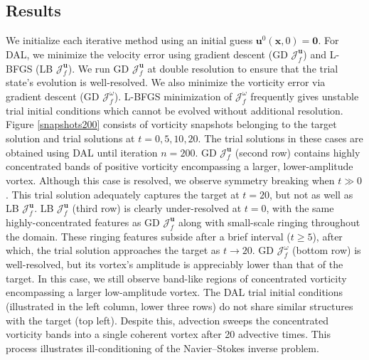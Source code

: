 \documentclass[%
 reprint,
 amsmath,amssymb,
 aps,
 pre,
]{revtex4-2}
\renewcommand{\vec}[1]{\boldsymbol{#1}}
\newcommand{\JUf}{\mathcal{J}^{\vec{u}}_f}
\newcommand{\Jwf}{\mathcal{J}^{\omega}_f}
\begin{document}
\subsection{Results}
We initialize each iterative method using an initial guess $\vec{u}^0(\vec{x},0)=\vec{0}$.
For DAL, we minimize the velocity error using gradient descent (GD $\JUf$) and L-BFGS (LB $\JUf$).
We run GD $\JUf$ at double resolution to ensure that the trial state's evolution is well-resolved.
We also minimize the vorticity error via gradient descent (GD $\Jwf$).
L-BFGS minimization of $\Jwf$ frequently gives unstable trial initial conditions which cannot be evolved without additional resolution.
Figure \ref{snapshots200} consists of vorticity snapshots belonging to the target solution and trial solutions at $t=0,5,10,20$.
The trial solutions in these cases are obtained using DAL until iteration $n=200$.
GD $\JUf$ (second row) contains highly concentrated bands of positive vorticity encompassing a larger, lower-amplitude vortex.
Although this case is resolved, we observe symmetry breaking when $t\gg 0$.
This trial solution adequately captures the target at $t=20$, but not as well as LB $\JUf$.
LB $\JUf$ (third row) is clearly under-resolved at $t=0$, with the same highly-concentrated features as GD $\JUf$ along with small-scale ringing throughout the domain.
These ringing features subside after a brief interval ($t\geq 5$), after which, the trial solution approaches the target as $t\to 20$.
GD $\Jwf$ (bottom row) is well-resolved, but its vortex's amplitude is appreciably lower than that of the target.
In this case, we still observe band-like regions of concentrated vorticity encompassing a larger low-amplitude vortex.
The DAL trial initial conditions (illustrated in the left column, lower three rows) do not share similar structures with the target (top left).
Despite this, advection sweeps the concentrated vorticity bands into a single coherent vortex after 20 advective times.
This process illustrates ill-conditioning of the Navier--Stokes inverse problem.

\end{document}
